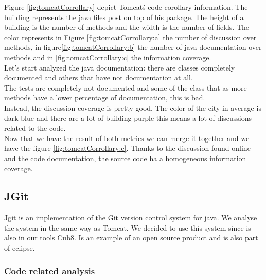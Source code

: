 \documentclass[]{usiinfbachelorproject}
\begin{document}
Figure \ref{fig:tomcatCorrollary} depict Tomcat\'s code corollary information. The building represents the java files post on top of his package. The height of a building is the number of methods and the width is the number of fields. The color represents in Figure \ref{fig:tomcatCorrollary:a}  the number of discussion over methods, in  figure\ref{fig:tomcatCorrollary:b} the number of java documentation over methods and in  \ref{fig:tomcatCorrollary:c}  the information coverage.\\
Let's start analyzed the java documentation: there are classes completely documented and others that have not documentation at all.\\
The tests are completely not documented and some of the class that as more methods have a lower percentage of documentation, this is bad.\\
Instead, the discussion coverage is pretty good. The color of the city in average is dark blue and there are a lot of building purple this means a lot of discussions related to the code. \\
Now that we have the result of both metrics we can merge it together and we have the figure \ref{fig:tomcatCorrollary:c}. Thanks to the discussion found online and the code documentation, the source code ha a homogeneous information coverage.
 

 

\newpage



\subsection{JGit}
	Jgit is an implementation of the Git version control system for java. We analyse the system in the same way as Tomcat. We decided to use this system since is also in our tools Cub8. Is an example of an open source product and is also part of eclipse.


\subsubsection{Code related analysis}
\end{document}
